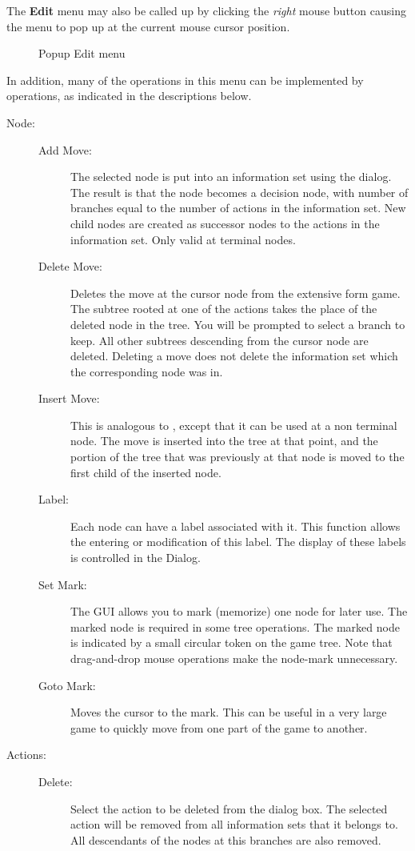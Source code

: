 \documentclass[12pt]{report}
\begin{document}
The {\bf Edit} menu may also be called up by clicking the {\em right}
mouse button causing the menu to pop up at the current mouse cursor
position.

\begin{figure}
\caption{Popup Edit menu}
\end{figure}

In addition, many of the operations in this menu can be implemented by 
 operations, as indicated in the
descriptions below.  

\begin{description}
\item[Node:]
\begin{description}
\item[Add Move:] The selected node is put into an information set
using the  dialog.  The result is that the
node becomes a decision node, with number of branches equal to the
number of actions in the information set.  New child nodes are created
as successor nodes to the actions in the information set.  Only valid
at terminal nodes.  
\item[Delete Move:] Deletes the move at the cursor node from the
extensive form game.  The subtree rooted at one of the actions takes
the place of the deleted node in the tree.  You will be prompted to
select a branch to keep.  All other subtrees descending from the
cursor node are deleted.  Deleting a move does not delete
the information set which the corresponding node was in.
\item[Insert Move:] This is analogous to ,
except that it can be used at a non terminal node.  The move is
inserted into the tree at that point, and the portion of the tree that
was previously at that node is moved to the first child of the
inserted node.
\item[Label:] Each node can have a label associated with it.  This
function allows the entering or modification of this label.  The
display of these labels is controlled in the 
 Dialog.
\item[Set Mark:] The GUI allows you to mark (memorize) one node for
later use.  The marked node is required in some tree operations.  The
marked node is indicated by a small circular token on the game tree.
Note that drag-and-drop mouse operations make the node-mark
unnecessary.
\item[Goto Mark:]  Moves the cursor to the mark.  This can be useful in a 
very large game to quickly move from one part of the game to another. 
\end{description}
\item[Actions:]
\begin{description}
\item[Delete:] Select the action to be deleted from the dialog box.
The selected action will be removed from all information sets that it
belongs to.  All descendants of the nodes at this branches are also
removed.


\end{description}
\end{description}
\end{document}
